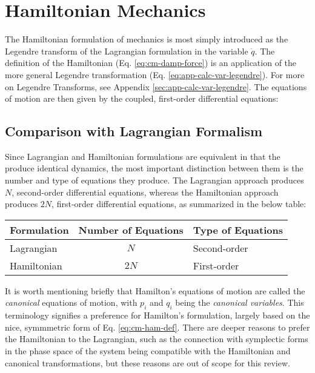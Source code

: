 \newpage
\section{Hamiltonian Mechanics}
\label{sec:cm-hamiltonian}

The Hamiltonian formulation of mechanics is most simply introduced as the Legendre transform of the Lagrangian formulation in the variable $\dot{q}$. The definition of the Hamiltonian (Eq. \ref{eq:cm-damp-force}) is an application of the more general Legendre transformation (Eq. \ref{eq:app-calc-var-legendre}). For more on Legendre Transforms, see Appendix \ref{sec:app-calc-var-legendre}.
The equations of motion are then given by the coupled, first-order differential equations:

\subsection{Comparison with Lagrangian Formalism}
Since Lagrangian and Hamiltonian formulations are equivalent in that the produce identical dynamics, the most important distinction between them is the number and type of equations they produce. The Lagrangian approach produces $N$, second-order differential equations, whereas the Hamiltonian approach produces $2N$, first-order differential equations, as summarized in the below table:

\begin{center}
	\begin{tabular}{lcl}
	 \textbf{Formulation} & \textbf{Number of Equations} & \textbf{Type of Equations} \\
	\hline
	 Lagrangian & $N$ & Second-order \\
	 Hamiltonian & $2N$ & First-order \\
	\end{tabular}
\end{center}

It is worth mentioning briefly that Hamilton's equations of motion are called the \textit{canonical} equations of motion, with $p_i$ and $q_i$ being the \textit{canonical variables}. This terminology signifies a preference for Hamilton's formulation, largely based on the nice, symmmetric form of Eq. \ref{eq:cm-ham-def}. There are deeper reasons to prefer the Hamiltonian to the Lagrangian, such as the connection with symplectic forms in the phase space of the system being compatible with the Hamiltonian and canonical transformations, but these reasons are out of scope for this review.


